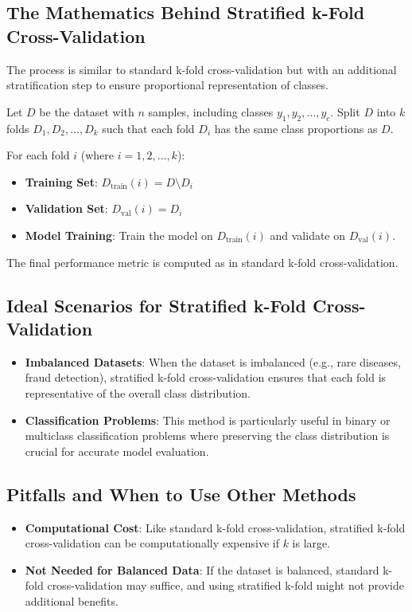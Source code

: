 \documentclass[10pt]{article}
\begin{document}
\subsection{The Mathematics Behind Stratified k-Fold Cross-Validation}
The process is similar to standard k-fold cross-validation but with an additional stratification step to ensure proportional representation of classes.

Let \(D\) be the dataset with \(n\) samples, including classes \(y_1, y_2, \dots, y_c\). Split \(D\) into \(k\) folds \(D_1, D_2, \dots, D_k\) such that each fold \(D_i\) has the same class proportions as \(D\).

For each fold \(i\) (where \(i = 1, 2, \dots, k\)):

\begin{itemize}
    \item \textbf{Training Set}: \(D_{\text{train}}(i) = D \setminus D_i\)
    \item \textbf{Validation Set}: \(D_{\text{val}}(i) = D_i\)
    \item \textbf{Model Training}: Train the model on \(D_{\text{train}}(i)\) and validate on \(D_{\text{val}}(i)\).
\end{itemize}

The final performance metric is computed as in standard k-fold cross-validation.

\subsection{Ideal Scenarios for Stratified k-Fold Cross-Validation}
\begin{itemize}
    \item \textbf{Imbalanced Datasets}: When the dataset is imbalanced (e.g., rare diseases, fraud detection), stratified k-fold cross-validation ensures that each fold is representative of the overall class distribution.
    \item \textbf{Classification Problems}: This method is particularly useful in binary or multiclass classification problems where preserving the class distribution is crucial for accurate model evaluation.
\end{itemize}

\subsection{Pitfalls and When to Use Other Methods}
\begin{itemize}
    \item \textbf{Computational Cost}: Like standard k-fold cross-validation, stratified k-fold cross-validation can be computationally expensive if \(k\) is large.
    \item \textbf{Not Needed for Balanced Data}: If the dataset is balanced, standard k-fold cross-validation may suffice, and using stratified k-fold might not provide additional benefits.
\end{itemize}
\end{document}
